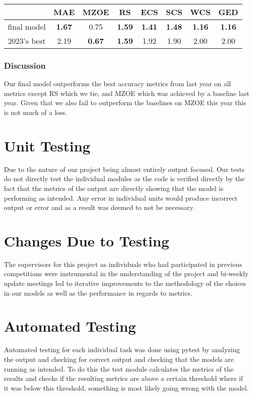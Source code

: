 \documentclass[12pt, titlepage]{article}
\begin{document}
\begin{tabular}{c|ccccccc}
  &  MAE   & MZOE  & RS    & ECS   & SCS   & WCS   & GED \\ \hline
final model  & \textbf{1.67}  & 0.75  & \textbf{1.59}  & \textbf{1.41}  & \textbf{1.48}  & \textbf{1.16} & \textbf{1.16} \\
2023's best  & 2.19  & \textbf{0.67}  & \textbf{1.59}  & 1.92  & 1.90  & 2.00  & 2.00 \\
\end{tabular}

\subsubsection{Discussion}
Our final model outperforms the best accuracy metrics from last year on all metrics except RS which we tie, and MZOE which was achieved by a baseline last year. Given that we also fail to outperform the baselines on MZOE this year this is not much of a loss.


\section{Unit Testing}

Due to the nature of our project being almost entirely output focused. Our
tests do not directly test the individual modules as the code is verified directly by the
fact that the metrics of the output are directly showing that the model is
performing as intended. Any error in individual units would produce incorrect output or error and as a result was deemed to not be necessary. 

\section{Changes Due to Testing}

The supervisors for this project as individuals who had participated in previous competitions were instrumental in the understanding of the project and bi-weekly update meetings led to iterative improvements to the methodology of the choices in our models as well as the performance in regards to metrics.

\section{Automated Testing}

Automated testing for each individual task was done using pytest by analyzing the output and checking for correct output and checking that the models are running as intended. To do this the test module calculates the metrics of the results and checks if the resulting metrics are above a certain threshold where if it was below this threshold, something is most likely going wrong with the model.
\end{document}
